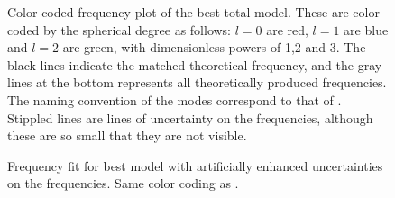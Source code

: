  \begin{figure}[htbp]
 	\centering
 	\caption{Color-coded frequency plot of the best total model.  These are color-coded by the spherical degree as follows: $l=0$ are red, $l=1$ are blue and  $l=2$ are green, with dimensionless powers of 1,2 and 3. The black lines indicate the matched theoretical frequency, and the gray lines at the bottom represents all theoretically produced frequencies. The naming convention of the modes correspond to that of \citet{lenz2010delta}. Stippled lines are lines of uncertainty on the frequencies, although these are so small that they are not visible.}
 	\label{freqfitbest}
 \end{figure}
\begin{figure}[htbp]
	\centering
	\caption{Frequency fit for best model with artificially enhanced uncertainties on the frequencies. Same color coding as .}
	\label{freqfitpumped}
\end{figure}
 
